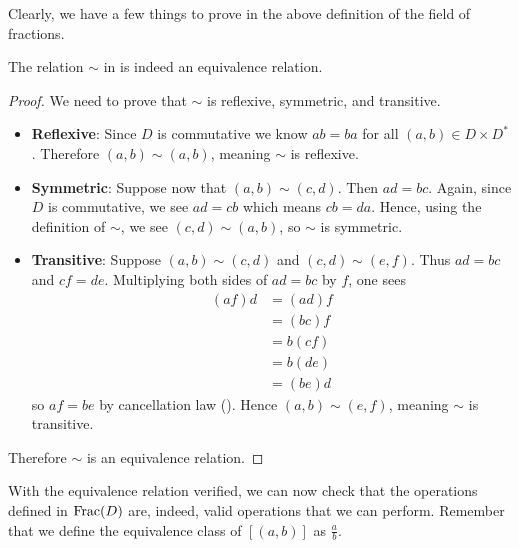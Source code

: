 Clearly, we have a few things to prove in the above definition of the field of fractions.

\begin{proposition}
    The relation $\sim$ in  is indeed an equivalence relation.
\end{proposition}
\begin{proof}
    We need to prove that $\sim$ is reflexive, symmetric, and transitive.
    \begin{itemize}
        \item \textbf{Reflexive}: Since $D$ is commutative we know $ab = ba$ for all $(a,b) \in D \times D^\ast$. Therefore $(a, b) \mathrel{\sim} (a, b)$, meaning $\sim$ is reflexive.
        
        \item \textbf{Symmetric}: Suppose now that $(a,b)\mathrel{\sim}(c,d)$. Then $ad = bc$. Again, since $D$ is commutative, we see $ad = cb$ which means $cb = da$. Hence, using the definition of $\sim$, we see $(c,d)\mathrel{\sim}(a,b)$, so $\sim$ is symmetric.
        
        \item \textbf{Transitive}: Suppose $(a,b)\mathrel{\sim}(c,d)$ and $(c,d)\mathrel{\sim}(e,f)$. Thus $ad = bc$ and $cf = de$. Multiplying both sides of $ad = bc$ by $f$, one sees
        \begin{align*}
            (af)d &= (ad)f\\
            &= (bc)f\\
            &= b(cf)\\
            &= b(de)\\
            &= (be)d
        \end{align*}
        so $af = be$ by cancellation law (). Hence $(a,b)\mathrel{\sim}(e,f)$, meaning $\sim$ is transitive.
    \end{itemize}
    Therefore $\sim$ is an equivalence relation.
\end{proof}

With the equivalence relation verified, we can now check that the operations defined in $\mathrm{Frac}(D)$ are, indeed, valid operations that we can perform. Remember that we define the equivalence class of $[(a, b)]$ as $\frac ab$.

